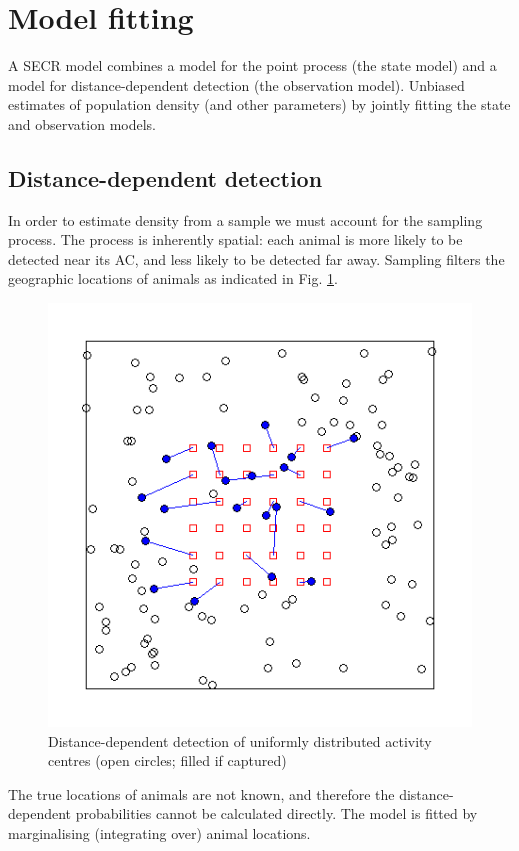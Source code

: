 \documentclass[
]{book}
\begin{document}
\section{Model fitting}\label{model-fitting}

A SECR model combines a model for the point process (the state model) and a
model for distance-dependent detection (the observation model). Unbiased estimates
of population density (and other parameters) by jointly fitting the state and observation models.

\subsection{Distance-dependent detection}\label{distance-dependent-detection}

In order to estimate density from a sample we must account for the sampling process. The process is inherently spatial: each animal is more likely to be detected near its AC, and less likely to be detected far away. Sampling filters the geographic locations of animals as indicated in Fig. \ref{fig:example}.

\begin{figure}
\includegraphics[width=0.7\linewidth]{figures/example} \caption{Distance-dependent detection of uniformly distributed activity centres (open circles; filled if captured)}\label{fig:example}
\end{figure}

The true locations of animals are not known, and therefore the distance-dependent probabilities cannot be calculated directly. The model is fitted by marginalising (integrating over) animal locations.
\end{document}
